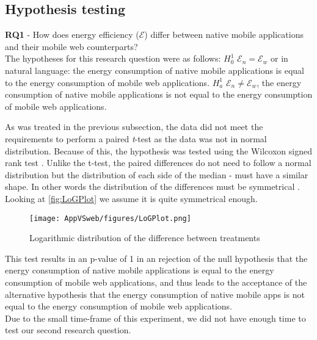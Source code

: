 
%
\subsection{Hypothesis testing}
\textbf{RQ1} - How does energy efficiency ($\mathcal{E}$)  differ between native mobile applications and their mobile web counterparts?
\\
\newline 
The hypotheses for this research question were as follows:
\newline $H_0^1$        $\mathcal{E}_n = \mathcal{E}_w$ or in natural language: the energy consumption of native mobile applications is equal to the energy consumption of mobile web applications.
\newline $H_a^1$      $\mathcal{E}_n \neq \mathcal{E}_w$, the energy consumption of native mobile applications is not equal to the energy consumption of mobile web applications.

As was treated in the previous subsection, the data did not meet the requirements to perform a paired \textit{t}-test as the data was not in normal distribution. Because of this, the hypothesis was tested using the Wilcoxon signed rank test \cite{10.2307/3001968}. Unlike the t-test, the paired differences do not need to follow a normal distribution but the distribution of each side of the median - must have a similar shape. In other words the distribution of the differences must be symmetrical \cite{Wilcoxon}. Looking at \autoref{fig:LoGPlot} we assume it is quite symmetrical enough. 

\begin{figure}[t]
    \centering
    \texttt{[image: AppVSweb/figures/LoGPlot.png]}
    \caption{Logarithmic distribution of the difference between treatments}
    \label{fig:LoGPlot}
\end{figure}


This test results in an p-value of 1 in an rejection of the null hypothesis that the energy consumption of native mobile applications is equal to the energy consumption of mobile web applications, and thus leads to the acceptance of the alternative hypothesis that the energy consumption of native mobile apps is not equal to the energy consumption of mobile web applications.
\\\newline
Due to the small time-frame of this experiment, we did not have enough time to test our second research question. 


